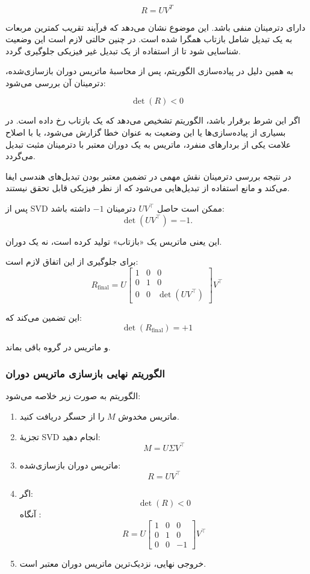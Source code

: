 \documentclass{article}
\begin{document}
\[
R = UV^T
\]

دارای دترمینان منفی باشد. این موضوع نشان می‌دهد که فرآیند تقریب کمترین مربعات به یک تبدیل شامل بازتاب همگرا شده است. در چنین حالتی لازم است این وضعیت شناسایی شود تا از استفاده از یک تبدیل غیر فیزیکی جلوگیری گردد.

به همین دلیل در پیاده‌سازی الگوریتم، پس از محاسبهٔ ماتریس دوران بازسازی‌شده، دترمینان آن بررسی می‌شود:

\[
\det(R) < 0
\]

اگر این شرط برقرار باشد، الگوریتم تشخیص می‌دهد که یک بازتاب رخ داده است. در بسیاری از پیاده‌سازی‌ها یا این وضعیت به عنوان خطا گزارش می‌شود، یا با اصلاح علامت یکی از بردارهای منفرد، ماتریس به یک دوران معتبر با دترمینان مثبت تبدیل می‌گردد.

در نتیجه بررسی دترمینان نقش مهمی در تضمین معتبر بودن تبدیل‌های هندسی ایفا می‌کند و مانع استفاده از تبدیل‌هایی می‌شود که از نظر فیزیکی قابل تحقق نیستند.



پس از SVD ممکن است حاصل $UV^\top$ دترمینان $-1$ داشته باشد:
\[
\det(UV^\top) = -1.
\]

این یعنی ماتریس یک «بازتاب» تولید کرده است، نه یک دوران.

برای جلوگیری از این اتفاق لازم است:
\[
R_{\text{final}} = U 
\begin{bmatrix}
	1 & 0 & 0\\
	0 & 1 & 0\\
	0 & 0 & \det(UV^\top)
\end{bmatrix}
V^\top
\]

این تضمین می‌کند که:
\[
\det(R_{\text{final}})=+1
\]

و ماتریس در گروه  باقی بماند.


\subsubsection{الگوریتم نهایی بازسازی ماتریس دوران}
الگوریتم به صورت زیر خلاصه می‌شود:

\begin{enumerate}
	\item ماتریس مخدوش $M$ را از حسگر دریافت کنید.
	\item تجزیهٔ SVD انجام دهید:
	\[
	M = U\Sigma V^\top
	\]
	\item ماتریس دوران بازسازی‌شده:
	\[
	R = UV^\top
	\]
	\item اگر:
	\[
	\det(R) < 0
	\]
	آنگاه :
	\[
	R = U
	\begin{bmatrix}
		1&0&0\\0&1&0\\0&0&-1
	\end{bmatrix}
	V^\top
	\]
	\item خروجی نهایی، نزدیک‌ترین ماتریس دوران معتبر است.
\end{enumerate}
\end{document}
